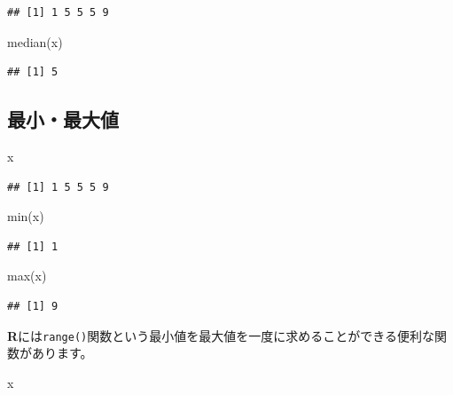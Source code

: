 \documentclass[
  12pt,
]{book}
\newenvironment{Shaded}{\begin{snugshade}}{\end{snugshade}}
\newcommand{\FunctionTok}[1]{\textcolor[rgb]{0.00,0.00,0.00}{#1}}
\newcommand{\NormalTok}[1]{#1}
\begin{document}
\begin{verbatim}
## [1] 1 5 5 5 9
\end{verbatim}

\begin{Shaded}
\begin{Highlighting}[]
\FunctionTok{median}\NormalTok{(x)}
\end{Highlighting}
\end{Shaded}

\begin{verbatim}
## [1] 5
\end{verbatim}

\hypertarget{ux6700ux5c0fux6700ux5927ux5024}{%
\subsection{最小・最大値}\label{ux6700ux5c0fux6700ux5927ux5024}}

\begin{Shaded}
\begin{Highlighting}[]
\NormalTok{x}
\end{Highlighting}
\end{Shaded}

\begin{verbatim}
## [1] 1 5 5 5 9
\end{verbatim}

\begin{Shaded}
\begin{Highlighting}[]
\FunctionTok{min}\NormalTok{(x)}
\end{Highlighting}
\end{Shaded}

\begin{verbatim}
## [1] 1
\end{verbatim}

\begin{Shaded}
\begin{Highlighting}[]
\FunctionTok{max}\NormalTok{(x)}
\end{Highlighting}
\end{Shaded}

\begin{verbatim}
## [1] 9
\end{verbatim}

\textbf{R}には\texttt{range()}関数という最小値を最大値を一度に求めることができる便利な関数があります。

\begin{Shaded}
\begin{Highlighting}[]
\NormalTok{x}
\end{Highlighting}
\end{Shaded}
\end{document}
